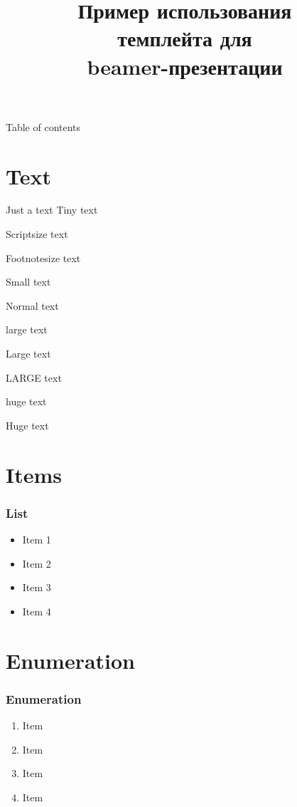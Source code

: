 

\title[bash]{Пример использования\\темплейта для\\beamer-презентации}



\begin{frame}
	\titlepage
\end{frame}

\begin{frame}{Table of contents}
	\tableofcontents
\end{frame}




\section{Text}
\begin{frame}{Just a text}
    \tiny Tiny text

    \scriptsize Scriptsize text

    \footnotesize Footnotesize text

    \small Small text

    \normalsize Normal text

    \large large text

    \Large Large text

    \LARGE LARGE text

    \huge huge text

    \Huge Huge text

\end{frame}

\section{Items}
\begin{frame}
    \frametitle{List}

    \begin{itemize}
	\item Item 1
	\item Item 2
	\item Item 3
	\item Item 4
    \end{itemize}
\end{frame}

\section{Enumeration}
\begin{frame}
    \frametitle{Enumeration}

    \begin{enumerate}
	\item Item
	\item Item
	\item Item
	\item Item
    \end{enumerate}
\end{frame}

